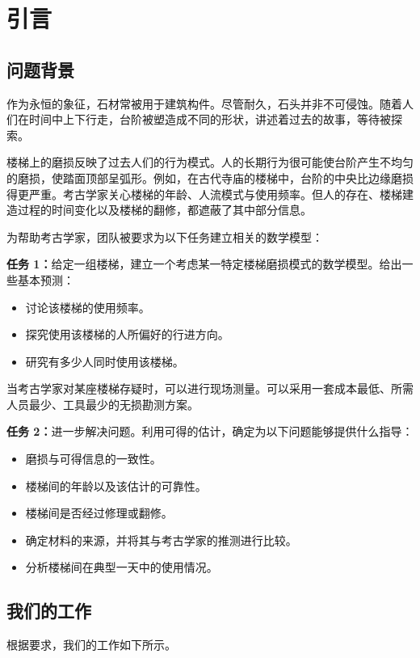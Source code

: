 \documentclass[11pt,a4paper]{ctexart}
\begin{document}
\section{引言}

\subsection{问题背景}

作为永恒的象征，石材常被用于建筑构件。尽管耐久，石头并非不可侵蚀。随着人们在时间中上下行走，台阶被塑造成不同的形状，讲述着过去的故事，等待被探索。

楼梯上的磨损反映了过去人们的行为模式。人的长期行为很可能使台阶产生不均匀的磨损，使踏面顶部呈弧形。例如，在古代寺庙的楼梯中，台阶的中央比边缘磨损得更严重。考古学家关心楼梯的年龄、人流模式与使用频率。但人的存在、楼梯建造过程的时间变化以及楼梯的翻修，都遮蔽了其中部分信息。

为帮助考古学家，团队被要求为以下任务建立相关的数学模型：

\textbf{任务 1：}给定一组楼梯，建立一个考虑某一特定楼梯磨损模式的数学模型。给出一些基本预测：
\begin{itemize}
\item 讨论该楼梯的使用频率。
\item 探究使用该楼梯的人所偏好的行进方向。
\item 研究有多少人同时使用该楼梯。
\end{itemize}

当考古学家对某座楼梯存疑时，可以进行现场测量。可以采用一套成本最低、所需人员最少、工具最少的无损勘测方案。

\textbf{任务 2：}进一步解决问题。利用可得的估计，确定为以下问题能够提供什么指导：
\begin{itemize}
\item 磨损与可得信息的一致性。
\item 楼梯间的年龄以及该估计的可靠性。
\item 楼梯间是否经过修理或翻修。
\item 确定材料的来源，并将其与考古学家的推测进行比较。
\item 分析楼梯间在典型一天中的使用情况。
\end{itemize}

\subsection{我们的工作}

根据要求，我们的工作如下所示。
\end{document}
